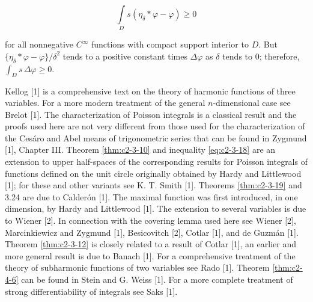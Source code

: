 \[
\int\limits_{D}s(\eta_{\delta}*\varphi-\varphi)\geq0
\]

for all nonnegative $C^\infty$ functions with compact support interior to $D$. But $\{\eta_\delta*\varphi-\varphi\}/\delta^2$ tends to a positive constant times $\Delta\varphi$ as $\delta$ tends to $0$; therefore, $\int_D s\,\Delta\varphi \geq 0$.

\bibnoteshead

Kellog [1] is a comprehensive text on the theory of harmonic functions of three variables. For a more modern treatment of the general $n$-dimensional case see Brelot [1]. The characterization of Poisson integrals is a classical result and the proofs used here are not very different from those used for the characterization of the Cesáro and Abel means of trigonometric series that can be found in Zygmund [1], Chapter III. Theorem \ref{thm:c2-3-10} and inequality \eqref{eq:c2-3-18} are an extension to upper half-spaces of the corresponding results for Poisson integrals of functions defined on the unit circle originally obtained by Hardy and Littlewood [1]; for these and other variants see K. T. Smith [1]. Theorems \ref{thm:c2-3-19} and 3.24 are due to Calderón [1]. The maximal function was first introduced, in one dimension, by Hardy and Littlewood [1]. The extension to several variables is due to Wiener [2]. In connection with the covering lemma used here see Wiener [2], Marcinkiewicz and Zygmund [1], Besicovitch [2], Cotlar [1], and de Guzmán [1]. Theorem \ref{thm:c2-3-12} is closely related to a result of Cotlar [1], an earlier and more general result is due to Banach [1]. For a comprehensive treatment of the theory of subharmonic functions of two variables see Rado [1]. Theorem \ref{thm:c2-4-6} can be found in Stein and G. Weiss [1]. For a more complete treatment of strong differentiability of integrals see Saks [1].

